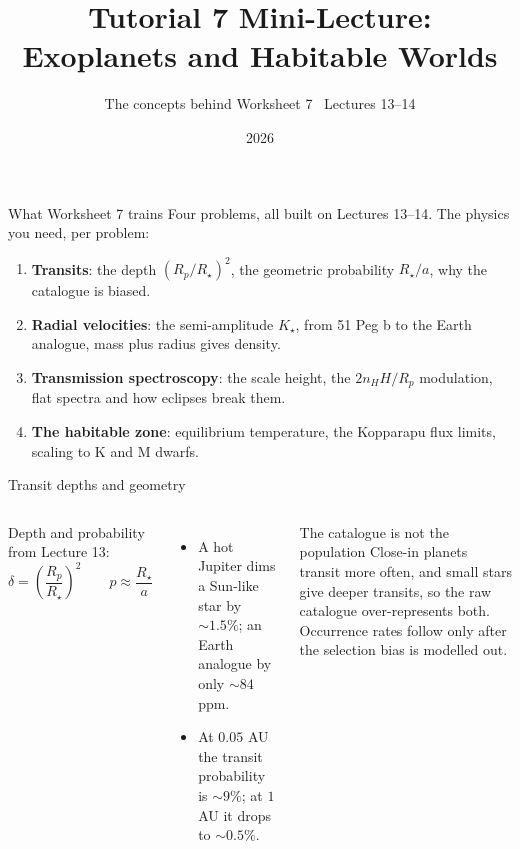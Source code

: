 \documentclass[aspectratio=169, 11pt]{beamer}
\title[T7 mini-lecture: Exoplanets and Habitable Worlds]{Tutorial 7 Mini-Lecture:\\Exoplanets and Habitable Worlds}
\subtitle{The concepts behind Worksheet 7 \textbullet\ Lectures 13--14}
\author{}
\institute{Kapteyn Astronomical Institute\\University of Groningen}
\date{2026}
\begin{document}
\begin{frame}
  \titlepage
\end{frame}

\begin{frame}{What Worksheet 7 trains}
  \small
  Four problems, all built on Lectures 13--14. The physics you need, per problem:
  \begin{enumerate}
    \item \textbf{Transits}: the depth $(R_p/R_\star)^2$, the geometric probability $R_\star/a$, why the catalogue is biased.
    \item \textbf{Radial velocities}: the semi-amplitude $K_\star$, from 51 Peg b to the Earth analogue, mass plus radius gives density.
    \item \textbf{Transmission spectroscopy}: the scale height, the $2n_H H/R_p$ modulation, flat spectra and how eclipses break them.
    \item \textbf{The habitable zone}: equilibrium temperature, the Kopparapu flux limits, scaling to K and M dwarfs.
  \end{enumerate}
\end{frame}

\begin{frame}{Transit depths and geometry}
  \small
  \begin{columns}[T]
    Depth and probability from Lecture 13:
    \[
      \boxed{\delta = \left(\frac{R_p}{R_\star}\right)^2} \qquad p \approx \frac{R_\star}{a}
    \]
    \begin{itemize}
      \item A hot Jupiter dims a Sun-like star by $\sim 1.5\%$; an Earth analogue by only $\sim 84$ ppm.
      \item At $0.05$ AU the transit probability is $\sim 9\%$; at $1$ AU it drops to $\sim 0.5\%$.
    \end{itemize}

    \begin{block}{The catalogue is not the population}
      Close-in planets transit more often, and small stars give deeper transits, so the raw catalogue over-represents both. Occurrence rates follow only after the selection bias is modelled out.
    \end{block}
  \end{columns}
\end{frame}
\end{document}
